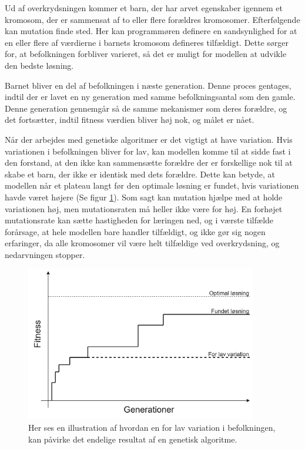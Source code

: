 Ud af overkrydsningen kommer et barn, der har arvet egenskaber igennem et kromosom, der er sammensat af to eller flere forældres kromosomer. Efterfølgende kan mutation finde sted. Her kan programmøren definere en sandsynlighed for at en eller flere af værdierne i barnets kromosom defineres tilfældigt. Dette sørger for, at befolkningen forbliver varieret, så det er muligt for modellen at udvikle den bedste løsning.
\par
Barnet bliver en del af befolkningen i næste generation. Denne proces gentages, indtil der er lavet en ny generation med samme befolkningsantal som den gamle. Denne generation gennemgår så de samme mekanismer som deres forældre, og det fortsætter, indtil fitness værdien bliver høj nok, og målet er nået.
\par
Når der arbejdes med genetiske algoritmer er det vigtigt at have variation. Hvis variationen i befolkningen bliver for lav, kan modellen komme til at sidde fast i den forstand, at den ikke kan sammensætte forældre der er forskellige nok til at skabe et barn, der ikke er identisk med dets forældre. Dette kan betyde, at modellen når et plateau langt før den optimale løsning er fundet, hvis variationen havde været højere (Se figur \ref{GA plateau}). Som sagt kan mutation hjælpe med at holde variationen høj, men mutationsraten må heller ikke være for høj. En forhøjet mutationsrate kan sætte hastigheden for læringen ned, og i værste tilfælde forårsage, at hele modellen bare handler tilfældigt, og ikke gør sig nogen erfaringer, da alle kromosomer vil være helt tilfældige ved overkrydsning, og nedarvningen stopper. 
\par
\begin{figure}[H]
    \centering
    \includegraphics[width=0.9\textwidth]{figures/GA_plateau.png}
    \caption{Her ses en illustration af hvordan en for lav variation i befolkningen, kan påvirke det endelige resultat af en genetisk algoritme.}
    \label{GA plateau}
\end{figure}
